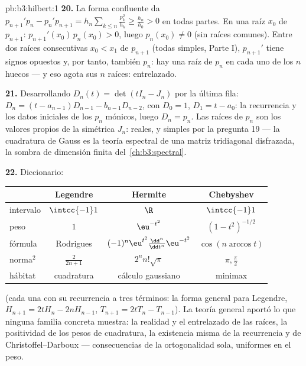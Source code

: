 \begin{solution}{pb:b3:hilbert:1}
\textbf{20.} La forma confluente da $p_{n+1}'p_n -
p_n'p_{n+1} = h_n\sum_{k\leq n}\frac{p_k^2}{h_k} \geq
\frac{h_n}{h_0} > 0$ en todas partes. En una raíz $x_0$ de $p_{n+1}$:
$p_{n+1}'(x_0)\,p_n(x_0) > 0$, luego $p_n(x_0) \neq
0$ (sin raíces comunes). Entre dos raíces consecutivas $x_0 < x_1$ de
$p_{n+1}$ (todas simples, Parte I), $p_{n+1}'$ tiene signos opuestos y,
por tanto, también $p_n$: hay una raíz de $p_n$ en cada uno de los $n$
huecos --- y eso agota sus $n$ raíces: entrelazado.

\textbf{21.} Desarrollando $D_n(t) = \det(tI_n - J_n)$ por la última
fila: $D_n = (t - a_{n-1})D_{n-1} - b_{n-1}D_{n-2}$, con $D_0 = 1$,
$D_1 = t - a_0$: la recurrencia y los datos iniciales de los $p_n$
mónicos, luego $D_n = p_n$. Las raíces de $p_n$ son los valores propios
de la simétrica $J_n$: reales, y simples por la pregunta 19 --- la
cuadratura de Gauss es la teoría espectral de una matriz tridiagonal
disfrazada, la sombra de dimensión finita del~\cref{ch:b3:spectral}.

\textbf{22.} Diccionario:
\begin{center}
\begin{tabular}{l|c|c|c}
 & Legendre & Hermite & Chebyshev\\
\hline
intervalo & $\intcc{-1}1$ & $\R$ & $\intcc{-1}1$\\
peso & $1$ & $\eu^{-t^2}$ & $(1-t^2)^{-1/2}$\\
fórmula & Rodrigues & $(-1)^n\eu^{t^2}
\frac{\dd^n}{\dd t^n}\eu^{-t^2}$ & $\cos(n\arccos t)$\\
norma$^2$ & $\frac2{2n+1}$ & $2^nn!\sqrt\pi$ & $\pi,
\frac\pi2$\\
hábitat & cuadratura & cálculo gaussiano & minimax\\
\end{tabular}
\end{center}
(cada una con su recurrencia a tres términos: la forma general para
Legendre, $H_{n+1} = 2tH_n - 2nH_{n-1}$, $T_{n+1} = 2tT_n -
T_{n-1}$). La teoría general aportó lo que ninguna familia concreta
muestra: la realidad y el entrelazado de las raíces, la positividad de
los pesos de cuadratura, la existencia misma de la recurrencia y de
Christoffel--Darboux --- consecuencias de la ortogonalidad sola,
uniformes en el peso.


\end{solution}
